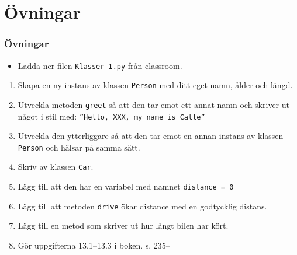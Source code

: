 \documentclass[aspectratio=169]{beamer}
\newcounter{uppgifter}
\begin{document}
\section{Övningar}

\begin{frame}
	\frametitle{Övningar}

	\begin{itemize}
		\item Ladda ner filen \texttt{Klasser 1.py} från classroom.
	\end{itemize}

	\begin{enumerate}
		\item Skapa en ny instans av klassen \texttt{Person} med ditt eget namn, ålder och längd.
		\item Utveckla metoden \texttt{greet} så att den tar emot ett annat namn och skriver ut något i stil med: \texttt{''Hello, XXX, my name is Calle''}
		\item Utveckla den ytterliggare så att den tar emot en annan instans av klassen \texttt{Person} och hälsar på samma sätt.
		\item Skriv av klassen \texttt{Car}.
		\item Lägg till att den har en variabel med namnet \texttt{distance = 0}
		\item Lägg till att metoden \texttt{drive} ökar distance med en godtycklig distans.
		\item Lägg till en metod som skriver ut hur långt bilen har kört.
		\item Gör uppgifterna 13.1--13.3 i boken. s. 235--
	\end{enumerate}
\end{frame}
\end{document}
